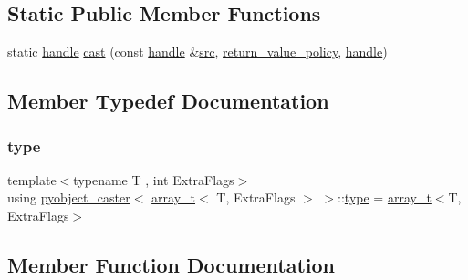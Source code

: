 \subsection*{Static Public Member Functions}
\begin{DoxyCompactItemize}
\item 
static \mbox{\hyperlink{classhandle}{handle}} \mbox{\hyperlink{structpyobject__caster_3_01array__t_3_01_t_00_01_extra_flags_01_4_01_4_af2fbc4ba55946572a989d6a17a89235b}{cast}} (const \mbox{\hyperlink{classhandle}{handle}} \&\mbox{\hyperlink{_s_d_l__opengl__glext_8h_a72e0fdf0f845ded60b1fada9e9195cd7}{src}}, \mbox{\hyperlink{detail_2common_8h_adde72ab1fb0dd4b48a5232c349a53841}{return\+\_\+value\+\_\+policy}}, \mbox{\hyperlink{classhandle}{handle}})
\end{DoxyCompactItemize}


\subsection{Member Typedef Documentation}
\mbox{\label{structpyobject__caster_3_01array__t_3_01_t_00_01_extra_flags_01_4_01_4_a05e8f86e245a6b880cd647b83c2fbd75}} 
\subsubsection{\texorpdfstring{type}{type}}
{\footnotesize\ttfamily template$<$typename T , int Extra\+Flags$>$ \\
using \mbox{\hyperlink{structpyobject__caster}{pyobject\+\_\+caster}}$<$ \mbox{\hyperlink{classarray__t}{array\+\_\+t}}$<$ T, Extra\+Flags $>$ $>$\+::\mbox{\hyperlink{structpyobject__caster_3_01array__t_3_01_t_00_01_extra_flags_01_4_01_4_a05e8f86e245a6b880cd647b83c2fbd75}{type}} =  \mbox{\hyperlink{classarray__t}{array\+\_\+t}}$<$T, Extra\+Flags$>$}



\subsection{Member Function Documentation}
\mbox{\label{structpyobject__caster_3_01array__t_3_01_t_00_01_extra_flags_01_4_01_4_af2fbc4ba55946572a989d6a17a89235b}} 
